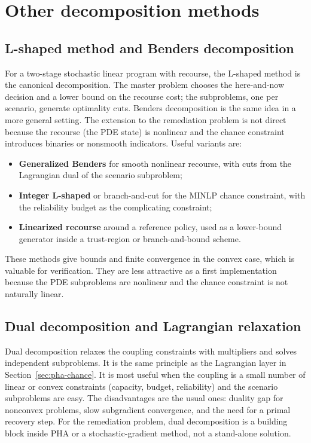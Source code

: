 \documentclass[11pt]{article}
\numberwithin{equation}{section}
\theoremstyle{plain}
\begin{document}
\section{Other decomposition methods}
\label{sec:decomp}

\subsection{L-shaped method and Benders decomposition}

For a two-stage stochastic linear program with recourse, the L-shaped method
\citep{vanslyke1969} is the canonical decomposition.  The master problem
chooses the here-and-now decision and a lower bound on the recourse cost; the
subproblems, one per scenario, generate optimality cuts.  Benders decomposition
\citep{benders1962} is the same idea in a more general setting.  The extension
to the remediation problem is not direct because the recourse (the PDE state)
is nonlinear and the chance constraint introduces binaries or nonsmooth
indicators.  Useful variants are:
\begin{itemize}[leftmargin=1.6em,itemsep=2pt]
  \item \textbf{Generalized Benders} for smooth nonlinear recourse, with cuts
        from the Lagrangian dual of the scenario subproblem;
  \item \textbf{Integer L-shaped} or branch-and-cut for the MINLP chance
        constraint, with the reliability budget as the complicating constraint;
  \item \textbf{Linearized recourse} around a reference policy, used as a
        lower-bound generator inside a trust-region or branch-and-bound
        scheme.
\end{itemize}
These methods give bounds and finite convergence in the convex case, which is
valuable for verification.  They are less attractive as a first implementation
because the PDE subproblems are nonlinear and the chance constraint is not
naturally linear.

\subsection{Dual decomposition and Lagrangian relaxation}

Dual decomposition relaxes the coupling constraints with multipliers and solves
independent subproblems.  It is the same principle as the Lagrangian layer in
Section~\ref{sec:pha-chance}.  It is most useful when the coupling is a small
number of linear or convex constraints (capacity, budget, reliability) and the
scenario subproblems are easy.  The disadvantages are the usual ones:
duality gap for nonconvex problems, slow subgradient convergence, and the need
for a primal recovery step.  For the remediation problem, dual decomposition is
a building block inside PHA or a stochastic-gradient method, not a stand-alone
solution.
\end{document}

